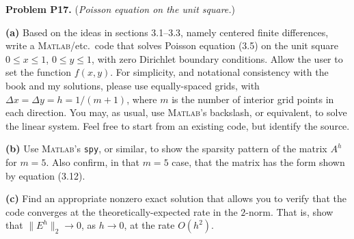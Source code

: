 \documentclass[12pt]{amsart}
\newcommand{\Matlab}{\textsc{Matlab}\xspace}
\newcommand{\prob}[1]{\bigskip\noindent\textbf{#1}\quad }
\newcommand{\epart}[1]{\medskip\noindent\textbf{(#1)}\quad }
\begin{document}
\prob{Problem P17.}  (\emph{Poisson equation on the unit square.})

\epart{a}  Based on the ideas in sections 3.1--3.3, namely centered finite differences, write a \Matlab/etc.~code that solves Poisson equation (3.5) on the unit square $0\le x \le 1$, $0 \le y \le 1$, with zero Dirichlet boundary conditions.  Allow the user to set the function $f(x,y)$.  For simplicity, and notational consistency with the book and my solutions, please use equally-spaced grids, with $\Delta x = \Delta y = h = 1 / (m+1)$, where $m$ is the number of interior grid points in each direction.  You may, as usual, use \Matlab's backslash, or equivalent, to solve the linear system.  Feel free to start from an existing code, but identify the source.

\epart{b}  Use \Matlab's \texttt{spy}, or similar, to show the sparsity pattern of the matrix $A^h$ for $m=5$.  Also confirm, in that $m=5$ case, that the matrix has the form shown by equation (3.12).

\epart{c}  Find an appropriate nonzero exact solution that allows you to verify that the code converges at the theoretically-expected rate in the $2$-norm.  That is, show that $\|E^h\|_2 \to 0$, as $h\to 0$, at the rate $O(h^2)$.
\end{document}
